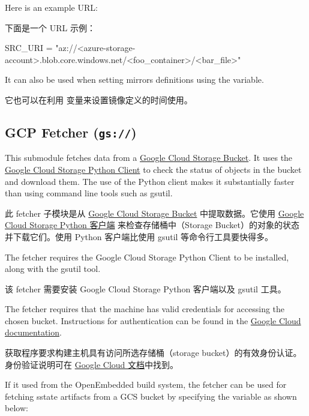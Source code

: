 Here is an example URL:

下面是一个 URL 示例：

\begin{pyglist}
SRC_URI = "az://<azure-storage-account>.blob.core.windows.net/<foo_container>/<bar_file>"
\end{pyglist}

It can also be used when setting mirrors definitions using the  variable.

它也可以在利用  变量来设置镜像定义的时间使用。

\subsection{GCP Fetcher (\texttt{gs://})}

This submodule fetches data from a \href{https://cloud.google.com/storage/docs/buckets}{Google Cloud Storage Bucket}. It uses the \href{https://cloud.google.com/python/docs/reference/storage/latest}{Google Cloud Storage Python Client} to check the status of objects in the bucket and download them. The use of the Python client makes it substantially faster than using command line tools such as gsutil.

此 fetcher 子模块是从 \href{https://cloud.google.com/storage/docs/buckets}{Google Cloud Storage Bucket} 中提取数据。它使用 \href{https://cloud.google.com/python/docs/reference/storage/latest}{Google Cloud Storage Python 客户端} 来检查存储桶中（Storage Bucket）的对象的状态并下载它们。使用 Python 客户端比使用 gsutil 等命令行工具要快得多。

The fetcher requires the Google Cloud Storage Python Client to be installed, along with the gsutil tool.

该 fetcher 需要安装 Google Cloud Storage Python 客户端以及 gsutil 工具。

The fetcher requires that the machine has valid credentials for accessing the chosen bucket. Instructions for authentication can be found in the \href{https://cloud.google.com/docs/authentication/provide-credentials-adc#local-dev}{Google Cloud documentation}.

获取程序要求构建主机具有访问所选存储桶（storage bucket）的有效身份认证。身份验证说明可在 \href{https://cloud.google.com/docs/authentication/provide-credentials-adc#local-dev}{Google Cloud 文档}中找到。



If it used from the OpenEmbedded build system, the fetcher can be used for fetching sstate artifacts from a GCS bucket by specifying the  variable as shown below:

